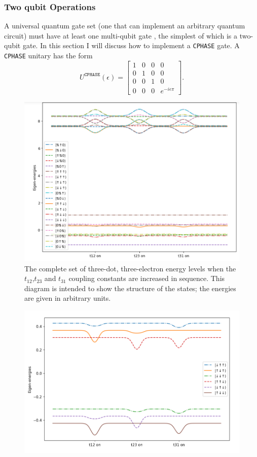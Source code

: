 \documentclass{report}
\begin{document}
\begin{appendices}
\subsubsection{Two qubit Operations}
A universal quantum gate set (one that can implement an arbitrary quantum circuit) must have at least one multi-qubit gate \cite{deutsch_1995}, the simplest of which is a two-qubit gate. In this section I will discuss how to implement a \texttt{CPHASE} gate. A \texttt{CPHASE} unitary has the form
\begin{equation*}
    U^{\texttt{CPHASE}}(\epsilon) = 
\begin{bmatrix}
1 & 0 & 0 & 0\\
0 & 1 & 0 & 0\\
0 & 0 & 1 & 0\\
0 & 0 & 0 & e^{-i\epsilon\pi}
\end{bmatrix}.
\end{equation*}
\begin{figure}[ht]
    \centering
    \includegraphics[scale = 0.7]{Figures/Energy_levels/elevels1.png}
    \caption{The complete set of three-dot, three-electron energy levels when the $t_{12}$,$t_{23}$ and $t_{31}$ coupling constants are increased in sequence. This diagram is intended to show the structure of the states; the energies are given in arbitrary units.}
    \label{fig:alllevels}
\end{figure}
\begin{figure}[ht]
    \centering
    \includegraphics[scale = 0.7]{Figures/Energy_levels/elevels2.png}

\end{figure}
\end{appendices}
\end{document}
